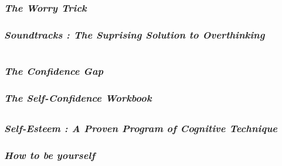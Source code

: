\documentclass[12pt, a4paper]{article}
\begin{document}
\section*{}
\subsubsection*{\emph{The Worry Trick}}
\subsubsection*{\emph{Soundtracks : The Suprising Solution to Overthinking}\\}

\newpage

\section*{}
\subsubsection*{\emph{The Confidence Gap}}
\subsubsection*{\emph{The Self-Confidence Workbook}\\}

\subsection*{}
\subsubsection*{\emph{Self-Esteem : A Proven Program of Cognitive Technique}}
\subsubsection*{\emph{How to be yourself}}
\end{document}
